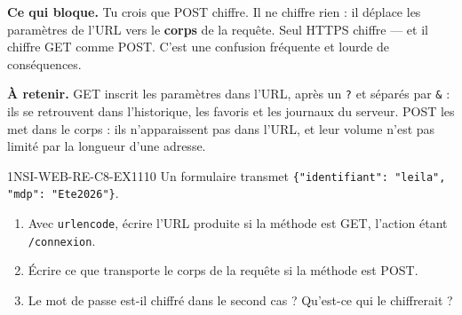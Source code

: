 

\textbf{Ce qui bloque.} Tu crois que POST chiffre. Il ne chiffre rien : il déplace les
paramètres de l'URL vers le \textbf{corps} de la requête. Seul HTTPS chiffre — et il chiffre
GET comme POST. C'est une confusion fréquente et lourde de conséquences.

\textbf{À retenir.} GET inscrit les paramètres dans l'URL, après un \lstinline{?} et séparés
par \lstinline{&} : ils se retrouvent dans l'historique, les favoris et les journaux du
serveur. POST les met dans le corps : ils n'apparaissent pas dans l'URL, et leur volume n'est
pas limité par la longueur d'une adresse.

\begin{exercice}{1NSI-WEB-RE-C8-EX1}{1}{10}
Un formulaire transmet \lstinline|{"identifiant": "leila", "mdp": "Ete2026"}|.
\begin{enumerate}
  \item Avec \lstinline{urlencode}, écrire l'URL produite si la méthode est GET, l'action étant
        \lstinline{/connexion}.
  \item Écrire ce que transporte le corps de la requête si la méthode est POST.
  \item Le mot de passe est-il chiffré dans le second cas ? Qu'est-ce qui le chiffrerait ?
\end{enumerate}
\end{exercice}

